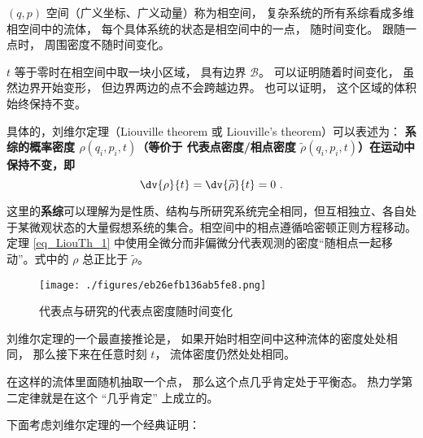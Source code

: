 

$(q, p)$ 空间（广义坐标、广义动量）称为相空间， 复杂系统的所有系综看成多维相空间中的流体， 每个具体系统的状态是相空间中的一点， 随时间变化。 跟随一点时， 周围密度不随时间变化。

$t$ 等于零时在相空间中取一块小区域， 具有边界 $\mathcal B$。 可以证明随着时间变化， 虽然边界开始变形， 但边界两边的点不会跨越边界。 也可以证明， 这个区域的体积始终保持不变。

具体的，刘维尔定理（Liouville theorem 或 Liouville's theorem）可以表述为：
\textbf{系综的概率密度 $\rho(q_i, p_i, t)$（等价于 代表点密度/相点密度 $\widetilde \rho(q_i, p_i, t)$）在运动中保持不变，即}
\begin{equation}\label{eq_LiouTh_1}
\dv{\rho}{t} = \dv{\widetilde{\rho}}{t} = 0 ~.
\end{equation}

这里的\textbf{系综}可以理解为是性质、结构与所研究系统完全相同，但互相独立、各自处于某微观状态的大量假想系统的集合。相空间中的相点遵循哈密顿正则方程移动。定理 \autoref{eq_LiouTh_1} 中使用全微分而非偏微分代表观测的密度“随相点一起移动”。式中的 $\rho$ 总正比于 $\widetilde \rho$。

\begin{figure}[ht]
\centering
\texttt{[image: ./figures/eb26efb136ab5fe8.png]}
\caption{代表点与研究的代表点密度随时间变化} \label{fig_LiouTh_2}
\end{figure}

%


刘维尔定理的一个最直接推论是， 如果开始时相空间中这种流体的密度处处相同， 那么接下来在任意时刻 $t$， 流体密度仍然处处相同。

在这样的流体里面随机抽取一个点， 那么这个点几乎肯定处于平衡态。 热力学第二定律就是在这个 “几乎肯定” 上成立的。


















下面考虑刘维尔定理的一个经典证明：

